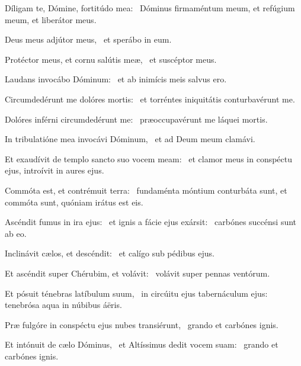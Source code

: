\item Díligam te, Dómine, fortitúdo mea:~\psstar{} Dóminus firmaméntum meum, et refúgium meum, et liberátor meus.

\item Deus meus adjútor meus,~\psstar{} et sperábo in eum.

\item Protéctor meus, et cornu salútis meæ,~\psstar{} et suscéptor meus.

\item Laudans invocábo Dóminum:~\psstar{} et ab inimícis meis salvus ero.

\item Circumdedérunt me dolóres mortis:~\psstar{} et torréntes iniquitátis conturbavérunt me.

\item Dolóres inférni circumdedérunt me:~\psstar{} præoccupavérunt me láquei mortis.

\item In tribulatióne mea invocávi Dóminum,~\psstar{} et ad Deum meum clamávi.

\item Et exaudívit de templo sancto suo vocem meam:~\psstar{} et clamor meus in conspéctu ejus, introívit in aures ejus.

\item Commóta est, et contrémuit terra:~\psstar{} fundaménta móntium conturbáta sunt, et commóta sunt, quóniam irátus est eis.

\item Ascéndit fumus in ira ejus:~\pscross{} et ignis a fácie ejus exársit:~\psstar{} carbónes succénsi sunt ab eo.

\item Inclinávit cælos, et descéndit:~\psstar{} et calígo sub pédibus ejus.

\item Et ascéndit super Chérubim, et volávit:~\psstar{} volávit super pennas ventórum.

\item Et pósuit ténebras latíbulum suum,~\pscross{} in circúitu ejus tabernáculum ejus:~\psstar{} tenebrósa aqua in núbibus áëris.

\item Præ fulgóre in conspéctu ejus nubes transiérunt,~\psstar{} grando et carbónes ignis.

\item Et intónuit de cælo Dóminus,~\pscross{} et Altíssimus dedit vocem suam:~\psstar{} grando et carbónes ignis.

